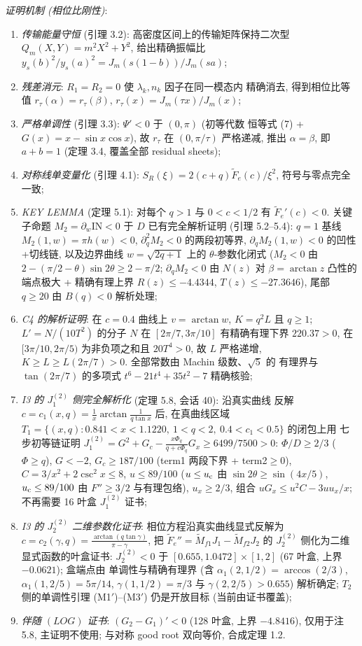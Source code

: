 \documentclass[UTF8]{ctexart}
\begin{document}
\emph{证明机制 (相位比刚性)}:
\begin{enumerate}
	\item \emph{传输能量守恒} (引理 3.2): 高密度区间上的传输矩阵保持二次型
		$Q_m(X,Y)=m^2X^2+Y^2$, 给出精确振幅比
		$y_s(b)^2/y_s(a)^2=J_m(s(1-b))/J_m(sa)$;
	\item \emph{残差消元}: $R_1=R_2=0$ 使 $\lambda_k,n_k$ 因子在同一模态内
		精确消去, 得到相位比等值 $r_\tau(\alpha)=r_\tau(\beta)$,
		$r_\tau(x)=J_m(\tau x)/J_m(x)$;
	\item \emph{严格单调性} (引理 3.3): $\Psi'<0$ 于 $(0,\pi)$ (初等代数
		恒等式 (7) + $G(x)=x-\sin x\cos x$), 故 $r_\tau$ 在 $(0,\pi/\tau)$
		严格递减, 推出 $\alpha=\beta$, 即 $a+b=1$ (定理 3.4, 覆盖全部
		residual sheets);
	\item \emph{对称线单变量化} (引理 4.1): $S_R(\xi)=2(c+q)\widetilde F_e(c)/\xi^2$,
		符号与零点完全一致;
	\item \emph{KEY LEMMA} (定理 5.1): 对每个 $q>1$ 与 $0<c<1/2$ 有
		$\widetilde F_e'(c)<0$. 关键子命题 $M_2=\partial_w\mathrm{IN}<0$ 于 $D$
		已有完全解析证明 (引理 5.2--5.4): $q=1$ 基线 $M_2(1,w)=\pi h(w)<0$,
		$\partial^2_qM_2<0$ 的两段初等界, $\partial_qM_2(1,w)<0$ 的凹性+切线链,
		以及边界曲线 $w=\sqrt{2q+1}$ 上的 $\theta$-参数化闭式 ($M_2<0$ 由
		$2-(\pi/2-\theta)\sin2\theta\ge2-\pi/2$; $\partial_qM_2<0$ 由 $N(z)$
		对 $\beta=\arctan z$ 凸性的端点极大 + 精确有理上界 $R(z)\le-4.4344$,
		$T(z)\le-27.3646$), 尾部 $q\ge20$ 由 $B(q)<0$ 解析处理;
	\item \emph{C4 的解析证明}: 在 $c=0.4$ 曲线上 $v=\arctan w$,
		$K=q^2L$ 且 $q\ge1$; $L'=N/(10T^2)$ 的分子 $N$ 在
		$[2\pi/7,3\pi/10]$ 有精确有理下界 $220.37>0$, 在
		$[3\pi/10,2\pi/5)$ 为非负项之和且 $20T^4>0$, 故 $L$ 严格递增,
		$K\ge L\ge L(2\pi/7)>0$. 全部常数由 Machin 级数、$\sqrt5$ 的
		有理界与 $\tan(2\pi/7)$ 的多项式 $t^6-21t^4+35t^2-7$ 精确核验;
	\item \emph{I3 的 $J_1^{(2)}$ 侧完全解析化} (定理 5.8, 会话 40): 沿真实曲线
		反解 $c=c_1(x,q)=\frac1x\arctan\frac1{q\tan x}$ 后, 在真曲线区域
		$T_1=\{(x,q):0.841<x<1.1220,\ 1<q<2,\ 0.4<c_1<0.5\}$ 的闭包上用
		七步初等链证明 $J_1^{(2)}=G^2+G_c-\frac{x\Phi_q}{q+c\Phi_q}G_x
		\ge6499/7500>0$: $\Phi/D\ge2/3$ ($\Phi\ge q$), $G<-2$, $G_c\ge187/100$
		(term1 两段下界 + term2$\ge0$), $C=3/x^2+2\csc^2x\le8$,
		$u\le89/100$ ($u\le u_{\rm c}$ 由 $\sin2\theta\ge\sin(4x/5)$, $u_{\rm c}\le89/100$
		由 $F''\ge3/2$ 与有理包络), $u_x\ge2/3$, 组合
		$uG_x\le u^2C-3uu_x/x$; 不再需要 16 叶盒 $J_1^{(2)}$ 证书;
	\item \emph{I3 的 $J_2^{(2)}$ 二维参数化证书}: 相位方程沿真实曲线显式反解为
		$c=c_2(\gamma,q)=\frac{\arctan(q\tan\gamma)}{\pi-\gamma}$, 把
		$\widetilde F_e''=\widetilde M_{f1}J_1-\widetilde M_{f2}J_2$ 的
		$J_2^{(2)}$ 侧化为二维显式函数的叶盒证书: $J_2^{(2)}<0$ 于
		$[0.655,1.0472]\times[1,2]$ (67 叶盒, 上界 $-0.0621$); 盒端点由
		单调性与精确有理界 (含 $\alpha_1(2,1/2)=\arccos(2/3)$,
		$\alpha_1(1,2/5)=5\pi/14$, $\gamma(1,1/2)=\pi/3$ 与
		$\gamma(2,2/5)>0.655$) 解析确定; $T_2$ 侧的单调性引理
		(M1$'$)--(M3$'$) 仍是开放目标 (当前由证书覆盖);
	\item \emph{伴随 $(LOG)$ 证书}: $(G_2-G_1)'<0$ (128 叶盒, 上界
		$-4.8416$), 仅用于注 5.8, 主证明不使用; 与对称 good root 双向等价,
		合成定理 1.2.
\end{enumerate}
\end{document}

